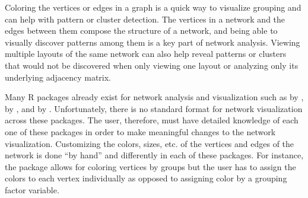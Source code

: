 Coloring the vertices or edges in a graph is a quick way to visualize grouping and can help with pattern or cluster detection. The vertices in a network and the edges between them compose the structure of a network, and being able to visually discover patterns among them is a key part of network analysis. Viewing multiple layouts of the same network can also help reveal patterns or clusters that would not be discovered when only viewing one layout or analyzing only its underlying adjacency matrix.

Many R packages already exist for network analysis and visualization such as  by \citet{igraph},  by \citet{sna}, and  by \citet{network.jss, network}. Unfortunately, there is no standard format for network visualization across these packages. The user, therefore, must have detailed knowledge of each one of these packages in order to make meaningful changes to the network visualization. Customizing the colors, sizes, etc. of the vertices and edges of the network is done ``by hand'' and differently in each of these packages. For instance, the  package allows for coloring vertices by groups but the user has to assign the colors to each vertex individually as opposed to assigning color by a grouping factor variable.

